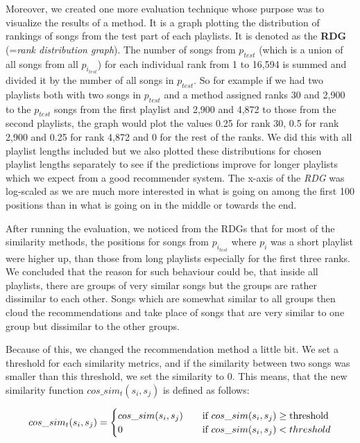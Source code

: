 Moreover, we created one more evaluation technique whose purpose was to visualize the results of a method. It is a graph plotting the distribution of rankings of songs from the test part of each playlists. It is denoted as the \textbf{RDG} (=\textit{rank distribution graph}). The number of songs from $p_{test}$ (which is a union of all songs from all $p_{i_{test}}$) for each individual rank from 1 to 16,594 is summed and divided it by the number of all songs in $p_{test}$. So for example if we had two playlists both with two songs in $p_{test}$ and a method assigned ranks 30 and 2,900 to the $p_{test}$ songs from the first playlist and 2,900 and 4,872 to those from the second playlists, the graph would plot the values 0.25 for rank 30, 0.5 for rank 2,900 and 0.25 for rank 4,872 and 0 for the rest of the ranks. We did this with all playlist lengths included but we also plotted these distributions for chosen playlist lengths separately to see if the predictions improve for longer playlists which we expect from a good recommender system. The x-axis of the \textit{RDG} was log-scaled as we are much more interested in what is going on among the first 100 positions than in what is going on in the middle or towards the end. 
    
After running the evaluation, we noticed from the RDGs that for most of the similarity methods, the positions for songs from $p_{i_{test}} $ where $p_i$ was a short playlist were higher up, than those from long playlists especially for the first three ranks. We concluded that the reason for such behaviour could be, that inside all playlists, there are groups of very similar songs but the groups are rather dissimilar to each other. Songs which are somewhat similar to all groups then cloud the recommendations and take place of songs that are very similar to one group but dissimilar to the other groups.

Because of this, we changed the recommendation method a little bit. We set a threshold for each similarity metrics, and if the similarity between two songs was smaller than this threshold, we set the similarity to 0. This means, that the new similarity function $cos\_sim_t(s_i,s_j)$ is defined as follows:

\[   
cos\_sim_t(s_i,s_j) = 
     \begin{cases}
       \text{$ cos\_sim(s_i,s_j) $} &\quad\text{if $ cos\_sim(s_i,s_j)$} \geq \text{threshold}\\
       \text{$ 0 $} &\quad\text{if $ cos\_sim(s_i,s_j)  < threshold$}\\
     \end{cases}
\]

